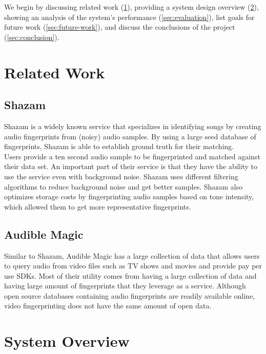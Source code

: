 \documentclass[paper=a4, fontsize=11pt]{scrartcl} %
\numberwithin{equation}{section} %
\numberwithin{figure}{section} %
\numberwithin{table}{section} %
\begin{document}
We begin by discussing related work (\ref{sec:related-work}), providing a system design overview (\ref{sec:system-overview}), showing an analysis of the system's performance (\ref{sec:evaluation}), list goals for future work (\ref{sec:future-work}), and discuss the conclusions of the project (\ref{sec:conclusion}).

\section{Related Work}
\label{sec:related-work}

\subsection{Shazam}
\label{sec:shazam}

Shazam is a widely known service that specializes in identifying songs by creating audio fingerprints from (noisy) audio samples. By using a large seed database of fingerprints, Shazam is able to establish ground truth for their matching. \\

Users provide a ten second audio sample to be fingerprinted and matched against their data set. An important part of their service is that they have the ability to use the service even with background noise. Shazam uses different filtering algorithms to reduce background noise and get better samples. Shazam also optimizes storage costs by fingerprinting audio samples based on tone intensity, which allowed them to get more representative fingerprints. \\

\subsection{Audible Magic}
\label{sec:audible-magic}

Similar to Shazam, Audible Magic has a large collection of data that allows users to query audio from video files such as TV shows and movies and provide pay per use SDKs. Most of their utility comes from having a large collection of data and having large amount of fingerprints that they leverage as a service. Although open source databases containing audio fingerprints are readily available online, video fingerprinting does not have the same amount of open data. \\

\section{System Overview}
\label{sec:system-overview}
\end{document}
